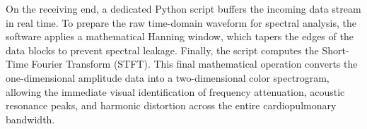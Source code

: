 On the receiving end, a dedicated Python script buffers the incoming data stream in real time. To prepare the raw time-domain waveform for spectral analysis, the software applies a mathematical Hanning window, which tapers the edges of the data blocks to prevent spectral leakage. Finally, the script computes the Short-Time Fourier Transform (STFT). This final mathematical operation converts the one-dimensional amplitude data into a two-dimensional color spectrogram, allowing the immediate visual identification of frequency attenuation, acoustic resonance peaks, and harmonic distortion across the entire cardiopulmonary bandwidth.
